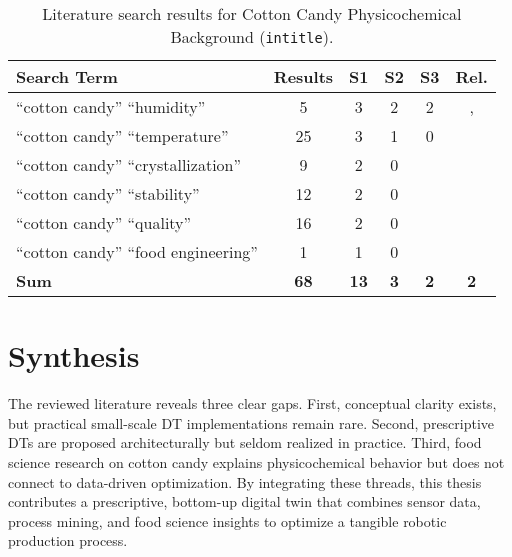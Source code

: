\begin{table}[h!]
  \centering
  \caption{Literature search results for Cotton Candy Physicochemical Background (\texttt{intitle}).}
  \label{tab:litsearch-cc}
  \begin{tabular}{l|c|c|c|c|c}
    \textbf{Search Term} & \textbf{Results} & \textbf{S1} & \textbf{S2} & \textbf{S3} & \textbf{Rel.} \\
    \hline
    ``cotton candy'' ``humidity''          & 5  & 3 & 2 & 2 & \cite{labuza}, \cite{TERASHIMA2022139953} \\
    ``cotton candy'' ``temperature''       & 25 & 3 & 1 & 0 &   \\
    ``cotton candy'' ``crystallization''   & 9  & 2 & 0 &   &   \\
    ``cotton candy'' ``stability''         & 12 & 2 & 0 &   &   \\
    ``cotton candy'' ``quality''           & 16 & 2 & 0 &   &   \\
    ``cotton candy'' ``food engineering''  & 1  & 1 & 0 &   &   \\
    \hline
    \textbf{Sum} & \textbf{68} & \textbf{13} & \textbf{3} & \textbf{2} & \textbf{2} \\
  \end{tabular}
\end{table}

\section*{Synthesis}
The reviewed literature reveals three clear gaps. First, conceptual clarity exists, but practical small-scale DT implementations remain rare. Second, prescriptive DTs are proposed architecturally but seldom realized in practice. Third, food science research on cotton candy explains physicochemical behavior but does not connect to data-driven optimization. By integrating these threads, this thesis contributes a prescriptive, bottom-up digital twin that combines sensor data, process mining, and food science insights to optimize a tangible robotic production process.